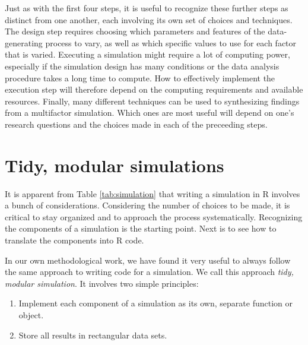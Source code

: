 \documentclass[
]{book}
\providecommand{\tightlist}{%
  \setlength{\itemsep}{0pt}\setlength{\parskip}{0pt}}
\begin{document}
Just as with the first four steps, it is useful to recognize these further steps as distinct from one another, each involving its own set of choices and techniques.
The design step requires choosing which parameters and features of the data-generating process to vary, as well as which specific values to use for each factor that is varied.
Executing a simulation might require a lot of computing power, especially if the simulation design has many conditions or the data analysis procedure takes a long time to compute.
How to effectively implement the execution step will therefore depend on the computing requirements and available resources.
Finally, many different techniques can be used to synthesizing findings from a multifactor simulation.
Which ones are most useful will depend on one's research questions and the choices made in each of the preceeding steps.

\section{Tidy, modular simulations}\label{tidy-modular-simulations}

It is apparent from Table \ref{tab:simulation} that writing a simulation in R involves a bunch of considerations.
Considering the number of choices to be made, it is critical to stay organized and to approach the process systematically.
Recognizing the components of a simulation is the starting point.
Next is to see how to translate the components into R code.

In our own methodological work, we have found it very useful to always follow the same approach to writing code for a simulation.
We call this approach \emph{tidy, modular simulation}. It involves two simple principles:

\begin{enumerate}
\def\labelenumi{\arabic{enumi}.}
\tightlist
\item
  Implement each component of a simulation as its own, separate function or object.
\item
  Store all results in rectangular data sets.
\end{enumerate}
\end{document}
